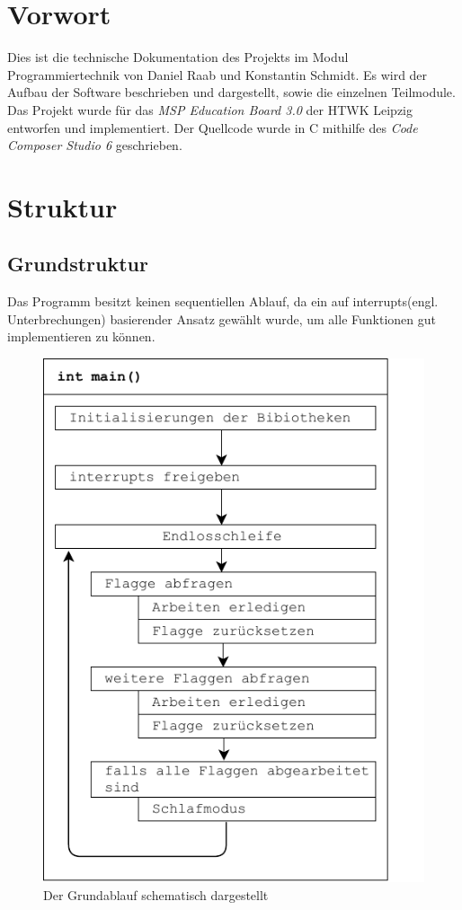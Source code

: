 \section{Vorwort}
Dies ist die technische Dokumentation des Projekts im Modul Programmiertechnik von Daniel Raab und Konstantin Schmidt. Es wird der Aufbau der Software beschrieben und dargestellt, sowie die einzelnen Teilmodule. Das Projekt wurde für das \emph{MSP Education Board 3.0} der HTWK Leipzig entworfen und implementiert. Der Quellcode wurde in C mithilfe des \emph{Code Composer Studio 6} geschrieben.
\section{Struktur}
\subsection{Grundstruktur}
Das Programm besitzt keinen sequentiellen Ablauf, da ein auf interrupts(engl. Unterbrechungen) basierender Ansatz gewählt wurde, um alle Funktionen gut implementieren zu können.
\begin{figure}[h]
    \centering
    \includegraphics{main_diagram.pdf}
    \caption{Der Grundablauf schematisch dargestellt}
    \label{img:grundablauf}
\end{figure}
